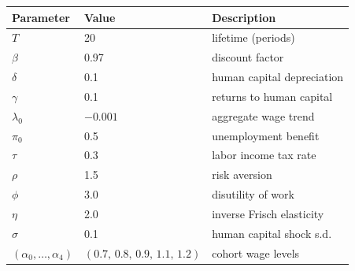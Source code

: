 \medskip
\begin{center}
\small
\begin{tabular}{llp{6.5cm}}
\toprule
Parameter & Value & Description \\
\midrule
$T$           & 20       & lifetime (periods) \\
$\beta$       & 0.97     & discount factor \\
$\delta$      & 0.1      & human capital depreciation \\
$\gamma$      & 0.1      & returns to human capital \\
$\lambda_0$   & $-0.001$ & aggregate wage trend \\
$\pi_0$       & 0.5      & unemployment benefit \\
$\tau$        & 0.3      & labor income tax rate \\
$\rho$        & 1.5      & risk aversion \\
$\phi$        & 3.0      & disutility of work \\
$\eta$        & 2.0      & inverse Frisch elasticity \\
$\sigma$      & 0.1      & human capital shock s.d. \\
$(\alpha_0,\ldots,\alpha_4)$ & $(0.7,\,0.8,\,0.9,\,1.1,\,1.2)$ & cohort wage levels \\
\bottomrule
\end{tabular}
\end{center}
